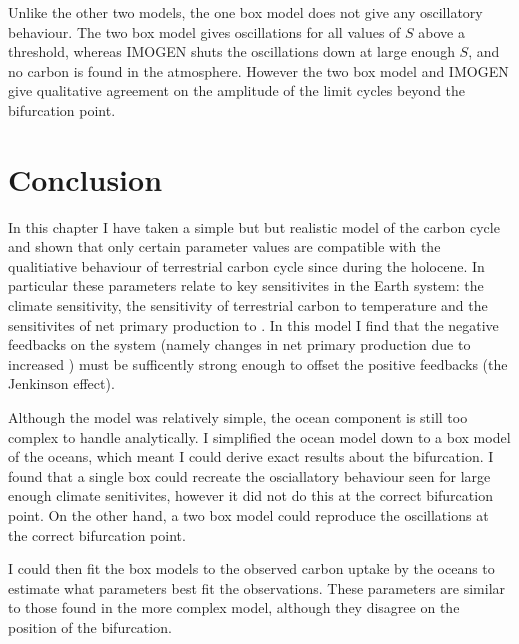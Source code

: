 Unlike the other two models, the one box model does not give any oscillatory behaviour. The two box model gives  oscillations for all values of $S$ above a threshold, whereas IMOGEN shuts the
oscillations down at large enough $S$, and no carbon is found in the atmosphere. However the two box model and IMOGEN give qualitative agreement on the amplitude of the limit cycles beyond the bifurcation
point.

\section{Conclusion}
In this chapter I have taken a simple but but realistic model of the carbon cycle and shown that only certain parameter values are compatible with the qualitiative behaviour
of terrestrial carbon cycle since during the holocene. In particular these parameters relate to key sensitivites in the Earth system: the climate sensitivity, the sensitivity of
terrestrial carbon to temperature and the sensitivites of net primary production to . In this model I find that the negative feedbacks on the system (namely changes in net primary
production due to increased ) must be sufficently strong enough to offset the positive feedbacks (the Jenkinson effect).

Although the model was relatively simple, the ocean component is still too complex to handle analytically. I simplified the ocean model down to a box model of the oceans,
which meant I could derive exact results about the bifurcation. I found that a single box could recreate the osciallatory behaviour seen for large enough climate senitivites,
however it did not do this at the correct bifurcation point. On the other hand, a two box model could reproduce the oscillations at the correct bifurcation point.

I could then fit the box models to the observed carbon uptake by the oceans to estimate what parameters best fit the observations. These parameters are similar to those found in the more
complex model, although they disagree on the position of the bifurcation.